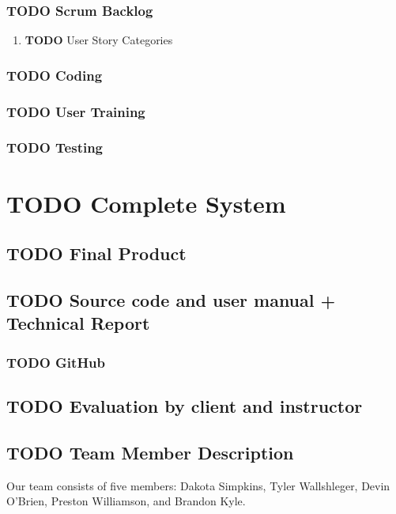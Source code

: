 \documentclass[11pt]{article}
\begin{document}
\subsubsection{{\bfseries\sffamily TODO} Scrum Backlog}
\label{sec:org01f16bd}
\begin{enumerate}
\item {\bfseries\sffamily TODO} User Story Categories
\label{sec:org514a9da}
\end{enumerate}
\subsubsection{{\bfseries\sffamily TODO} Coding}
\label{sec:org1ad44c2}
\subsubsection{{\bfseries\sffamily TODO} User Training}
\label{sec:orgd493984}
\subsubsection{{\bfseries\sffamily TODO} Testing}
\label{sec:org864b8ef}
\section{{\bfseries\sffamily TODO} Complete System}
\label{sec:org4754439}
\subsection{{\bfseries\sffamily TODO} Final Product}
\label{sec:org91a7f0c}
\subsection{{\bfseries\sffamily TODO} Source code and user manual + Technical Report}
\label{sec:orga6f6674}
\subsubsection{{\bfseries\sffamily TODO} GitHub}
\label{sec:org6e5a797}
\subsection{{\bfseries\sffamily TODO} Evaluation by client and instructor}
\label{sec:orgf2c50fa}

\subsection{{\bfseries\sffamily TODO} Team Member Description}
\label{sec:org5bb5f5a}
Our team consists of five members: Dakota Simpkins, Tyler Wallshleger,
Devin O'Brien, Preston Williamson, and Brandon Kyle.
\end{document}

